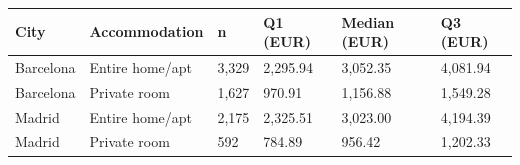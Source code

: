 \begin{tabular}{llllll}
\toprule
City & Accommodation & n & Q1 (EUR) & Median (EUR) & Q3 (EUR) \\
\midrule
Barcelona & Entire home/apt & 3,329 & 2,295.94 & 3,052.35 & 4,081.94 \\
Barcelona & Private room & 1,627 & 970.91 & 1,156.88 & 1,549.28 \\
Madrid & Entire home/apt & 2,175 & 2,325.51 & 3,023.00 & 4,194.39 \\
Madrid & Private room & 592 & 784.89 & 956.42 & 1,202.33 \\
\bottomrule
\end{tabular}
